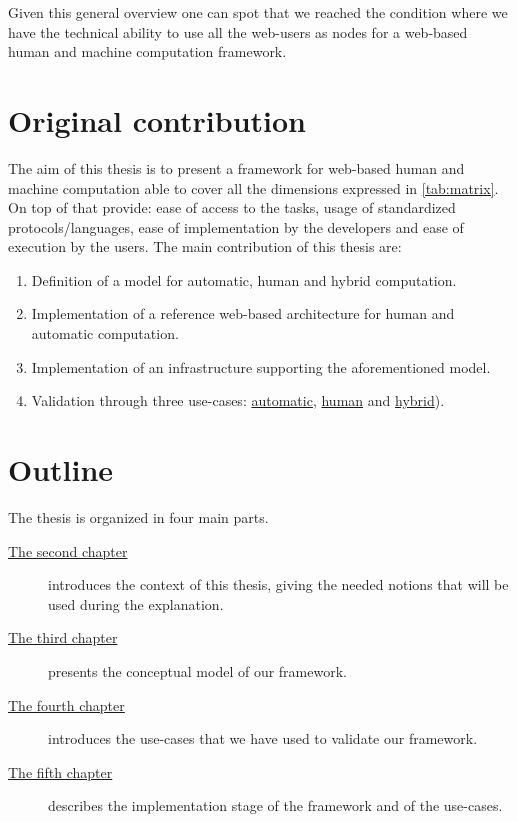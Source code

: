 Given this general overview one can spot that we reached the condition where we
have the technical ability to use all the web-users as nodes for a web-based human
and machine computation framework.

\section{Original contribution}
The aim of this thesis is to present a framework for web-based human and machine
computation able to cover all the dimensions expressed in \autoref{tab:matrix}.
On top of that provide: ease of access to the tasks, usage of
standardized protocols/languages, ease of implementation by the developers and
ease of execution by the users. The main contribution of this thesis are:
\begin{enumerate}
	\item Definition of a model for automatic, human and hybrid computation.
	\item Implementation of a reference web-based architecture for human and
	automatic computation.
	\item Implementation of an infrastructure supporting the aforementioned model.
	\item Validation through three use-cases:
	\hyperref[sec:cases:automatic]{automatic}, \hyperref[sec:cases:human]{human}
	and \hyperref[sec:cases:hybrid]{hybrid}).
\end{enumerate}







\section{Outline}
The thesis is organized in four main parts.
\begin{description}
	\item[{\hyperref[cap:bg]{The second chapter}}] introduces the context of this
	thesis, giving the needed notions that will be used during the explanation.

	\item[{\hyperref[cap:model]{The third chapter}}] presents the conceptual model
	of our framework.

	\item[{\hyperref[cap:cases]{The fourth chapter}}] introduces the use-cases
	that we have used to validate our framework.

	\item[{\hyperref[cap:implementation]{The fifth chapter}}] describes the
	implementation stage of the framework and of the use-cases.
\end{description}